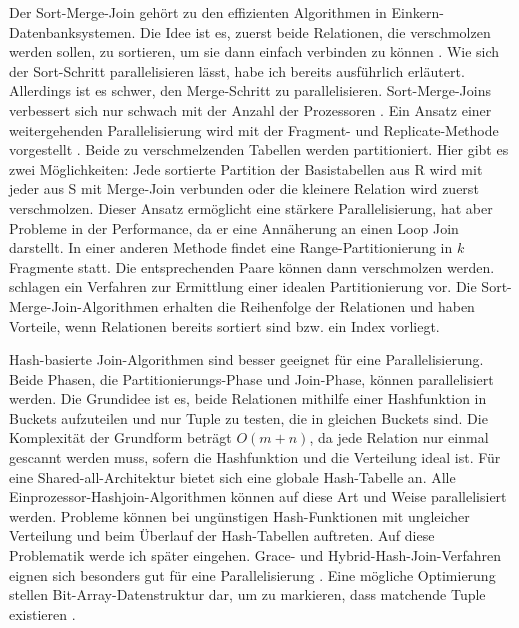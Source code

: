 \documentclass[a4paper,12pt,twoside]{article}
\begin{document}
Der Sort-Merge-Join gehört zu den effizienten Algorithmen in Einkern-Datenbanksystemen. Die Idee ist es, zuerst beide Relationen, die verschmolzen werden sollen, zu sortieren, um sie dann einfach verbinden zu können {\autocite[S. 149]{Lu1994}}. Wie sich der Sort-Schritt parallelisieren lässt, habe ich bereits ausführlich erläutert. Allerdings ist es schwer, den Merge-Schritt zu parallelisieren. Sort-Merge-Joins verbessert sich nur schwach mit der Anzahl der Prozessoren {\autocite{Yu1998}}. Ein Ansatz einer weitergehenden Parallelisierung wird mit der Fragment- und Replicate-Methode vorgestellt {\autocite {Richardson1987}}.  Beide zu verschmelzenden Tabellen werden partitioniert. Hier gibt es zwei Möglichkeiten: Jede sortierte Partition der Basistabellen aus R wird mit jeder aus S mit Merge-Join verbunden oder die kleinere Relation wird zuerst verschmolzen. Dieser Ansatz ermöglicht eine stärkere Parallelisierung, hat aber Probleme in der Performance, da er eine Annäherung an einen Loop Join darstellt. In einer anderen Methode findet eine Range-Partitionierung in $k$ Fragmente statt. Die entsprechenden Paare können dann verschmolzen werden. \textcite{Iyer1989} schlagen ein Verfahren zur Ermittlung einer idealen Partitionierung vor. Die Sort-Merge-Join-Algorithmen erhalten die Reihenfolge der Relationen und haben Vorteile, wenn Relationen bereits sortiert sind bzw. ein Index vorliegt.

Hash-basierte Join-Algorithmen sind besser geeignet für eine Parallelisierung. Beide Phasen, die Partitionierungs-Phase und Join-Phase, können parallelisiert werden. Die Grundidee ist es, beide Relationen mithilfe einer Hashfunktion in Buckets aufzuteilen und nur Tuple zu testen, die in gleichen Buckets sind. Die Komplexität der Grundform beträgt $O(m + n)$, da jede Relation nur einmal gescannt werden muss, sofern die Hashfunktion und die Verteilung ideal ist. Für eine Shared-all-Architektur bietet sich eine globale Hash-Tabelle an. Alle Einprozessor-Hashjoin-Algorithmen können auf diese Art und Weise parallelisiert werden. Probleme können bei ungünstigen Hash-Funktionen mit ungleicher Verteilung und beim Überlauf der Hash-Tabellen auftreten. Auf diese Problematik werde ich später eingehen. Grace- und Hybrid-Hash-Join-Verfahren eignen sich besonders gut für eine Parallelisierung {\autocite{DeWitt1985}}. Eine mögliche Optimierung stellen Bit-Array-Datenstruktur dar, um zu markieren, dass matchende Tuple existieren {\autocite{Valduriez1984}}.
\end{document}
